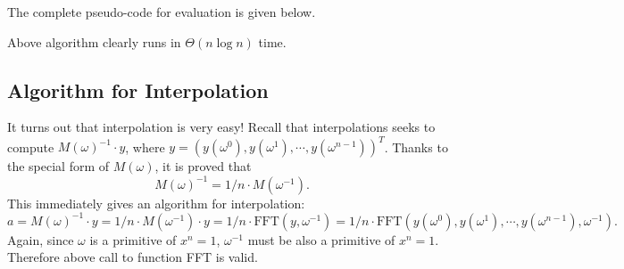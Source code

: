
The complete pseudo-code for evaluation is given below.

\begin{algorithmblock}[0.8\textwidth]
        \xxx
        \xxx
        \xxx
        \xxx
        \xxx
		\xxx
        \xxx
		 \xxx
        \xxx
\end{algorithmblock}

Above algorithm clearly runs in $\Theta(n\log n)$ time.


\subsection*{Algorithm for Interpolation}

It turns out that interpolation is very easy!
Recall that interpolations seeks to compute $M(\omega)^{-1} \cdot y$, where
$y = (y(\omega^0), y(\omega^1), \cdots, y(\omega^{n-1}))^T$.
Thanks to the special form of $M(\omega)$,
it is proved that
	   \[ M(\omega)^{-1} = 1/n \cdot M(\omega^{-1}).\]
This immediately gives an algorithm for interpolation: 
	$$a = M(\omega)^{-1} \cdot y = 1/n \cdot M(\omega^{-1}) \cdot y = 1/n \cdot \textrm{FFT}(y, \omega^{-1}) = 1/n \cdot \textrm{FFT}(y(\omega^0), y(\omega^1), \cdots, y(\omega^{n-1}), \omega^{-1}).$$
Again, since $\omega$ is a primitive of $x^n=1$, $\omega^{-1}$ must be also a primitive of $x^n=1$.
Therefore above call to function FFT is valid.

